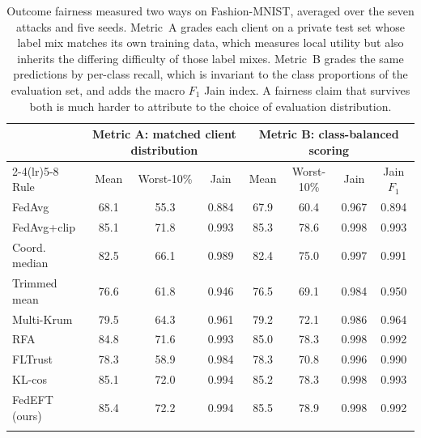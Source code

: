 \begin{table}[t]
\centering
\caption{Outcome fairness measured two ways on Fashion-MNIST, averaged over the seven attacks and five seeds. Metric~A grades each client on a private test set whose label mix matches its own training data, which measures local utility but also inherits the differing difficulty of those label mixes. Metric~B grades the same predictions by per-class recall, which is invariant to the class proportions of the evaluation set, and adds the macro $F_1$ Jain index. A fairness claim that survives both is much harder to attribute to the choice of evaluation distribution.}
\label{tab:fair_balanced}
\setlength{\tabcolsep}{3.6pt}
\footnotesize
\begin{tabular}{@{}lccccccc@{}}
\toprule
& \multicolumn{3}{c}{Metric A: matched client distribution}& \multicolumn{4}{c}{Metric B: class-balanced scoring}\\
\cmidrule(lr){2-4}\cmidrule(lr){5-8}
Rule & Mean & Worst-10\% & Jain & Mean & Worst-10\% & Jain & Jain $F_1$\\
\midrule
FedAvg & 68.1 & 55.3 & 0.884 & 67.9 & 60.4 & 0.967 & 0.894\\
FedAvg+clip & 85.1 & 71.8 & 0.993 & 85.3 & 78.6 & 0.998 & 0.993\\
Coord. median & 82.5 & 66.1 & 0.989 & 82.4 & 75.0 & 0.997 & 0.991\\
Trimmed mean & 76.6 & 61.8 & 0.946 & 76.5 & 69.1 & 0.984 & 0.950\\
Multi-Krum & 79.5 & 64.3 & 0.961 & 79.2 & 72.1 & 0.986 & 0.964\\
RFA & 84.8 & 71.6 & 0.993 & 85.0 & 78.3 & 0.998 & 0.992\\
FLTrust & 78.3 & 58.9 & 0.984 & 78.3 & 70.8 & 0.996 & 0.990\\
KL-cos & 85.1 & 72.0 & 0.994 & 85.2 & 78.3 & 0.998 & 0.993\\
\midrule
FedEFT (ours) & 85.4 & 72.2 & 0.994 & 85.5 & 78.9 & 0.998 & 0.992\\
\botrule
\end{tabular}
\end{table}
